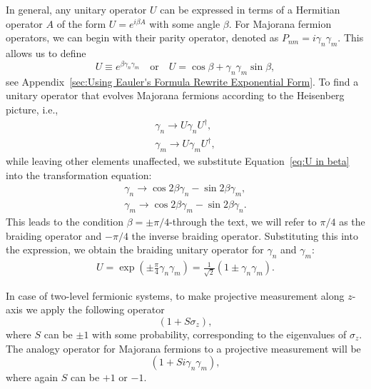\documentclass{article}
\begin{document}
In general, any unitary operator $ U $ can be expressed in terms of a Hermitian operator $ A $ of the form $ U = e^{i\beta A} $ with some angle $ \beta $. For Majorana fermion operators, we can begin with their parity operator, denoted as $ P_{nm} = i \gamma_n \gamma_m $. This allows us to define
\begin{equation}
	U \equiv e^{\beta \gamma_n \gamma_m} \quad \text{or} \quad U = \cos{\beta} + \gamma_n \gamma_m \sin{\beta},
	\label{eq:U in beta}
\end{equation}
see Appendix~\ref{sec:Using Eauler's Formula Rewrite Exponential Form}. To find a unitary operator that evolves Majorana fermions according to the Heisenberg picture, i.e.,
$$
	\begin{aligned}
		\gamma_n \rightarrow U \gamma_n U ^\dagger, \\
		\gamma_m \rightarrow U \gamma_m U ^\dagger,
	\end{aligned}
$$
while leaving other elements unaffected, we substitute Equation~\ref{eq:U in beta} into the transformation equation:
$$
	\begin{aligned}
		\gamma_n \rightarrow \cos{2 \beta} \gamma_n - \sin{2 \beta} \gamma_m, \\
		\gamma_m \rightarrow \cos{2 \beta} \gamma_m - \sin{2 \beta} \gamma_n.
		\label{eq:subst in transformation}
	\end{aligned}
$$
This leads to the condition $ \beta = \pm \pi / 4 $-through the text, we will refer to $ \pi /4 $ as the braiding operator and $ -\pi /4 $ the inverse braiding operator. Substituting this into the expression, we obtain the braiding unitary operator for $ \gamma_n $ and $ \gamma_m $:
$$
	\begin{aligned}
		U = \exp \left( \pm \frac{\pi}{4} \gamma_n \gamma_m\right) = \frac{1}{\sqrt{2}}\left(1 \pm \gamma_n \gamma_m\right).
	\end{aligned}
$$

In case of two-level fermionic systems, to make projective measurement along $ z $-axis we apply the following operator
\begin{equation*}
	(1 + S \sigma_z),
\end{equation*}
where $ S $ can be $ \pm 1 $ with some probability, corresponding to the eigenvalues of $ \sigma_z $. The analogy operator for Majorana fermions to a projective measurement will be
\[
	(1 + S i \gamma_n \gamma_m),
\]
where again $ S $ can be $ +1 $ or $ -1 $.
\end{document}
